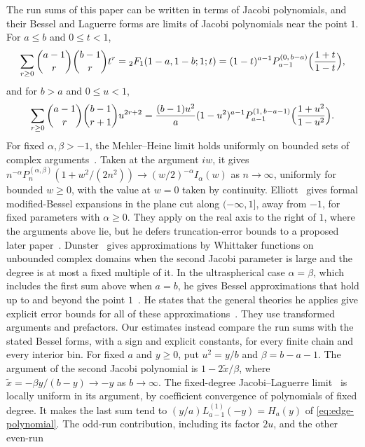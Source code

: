 \begin{remark}\label{rem:jacobi}
The run sums of this paper can be written in terms of Jacobi polynomials, and
their Bessel and Laguerre forms are limits of Jacobi polynomials near the
point $1$.
For $a\le b$ and $0\le t<1$,
\[
 \sum_{r\ge0}\binom{a-1}{r}\binom{b-1}{r}t^r
 ={}_2F_1(1-a,1-b;1;t)
 =(1-t)^{a-1}P_{a-1}^{(0,\,b-a)}\Bigl(\frac{1+t}{1-t}\Bigr),
\]
and for $b>a$ and $0\le u<1$,
\[
 \sum_{r\ge0}\binom{a-1}{r}\binom{b-1}{r+1}u^{2r+2}
 =\frac{(b-1)u^2}{a}(1-u^2)^{a-1}P_{a-1}^{(1,\,b-a-1)}\Bigl(\frac{1+u^2}{1-u^2}\Bigr).
\]
For fixed $\alpha,\beta>-1$, the Mehler--Heine limit
\cite[Eq.~18.11.5]{dlmf} holds uniformly on bounded sets of complex
arguments~\cite[Theorem~8.1.1]{szego1975}. Taken at the argument $iw$, it gives
$n^{-\alpha}P_n^{(\alpha,\beta)}(1+w^2/(2n^2))
\to(w/2)^{-\alpha}I_\alpha(w)$ as $n\to\infty$, uniformly for bounded $w\ge0$,
with the value at $w=0$ taken by continuity.
Elliott~\cite[Section~3, Eq.~(3.10)]{elliott1971} gives formal modified-Bessel
expansions in the plane cut along $(-\infty,1]$, away from $-1$, for fixed
parameters with $\alpha\ge0$. They apply on the real axis to the right of $1$,
where the arguments above lie, but he defers truncation-error bounds to a
proposed later paper~\cite[Section~1]{elliott1971}.
Dunster~\cite[Section~2, Eqs.~(2.43) to~(2.50)]{dunster1999} gives
approximations by Whittaker functions on unbounded complex domains when the
second Jacobi parameter is large and the degree is at most a fixed multiple
of it. In the ultraspherical case $\alpha=\beta$, which includes the
first sum above when $a=b$, he gives Bessel approximations that hold up
to and beyond the point $1$~\cite[Section~5, Eqs.~(5.11), (5.15)
and~(5.16)]{dunster1999}. He states that the general theories he applies
give explicit error bounds for all of these approximations~\cite[p.~287]{dunster1999}. They use transformed arguments
and prefactors. Our estimates instead compare the run sums with the stated
Bessel forms, with a sign and explicit constants, for every finite chain
and every interior bin.
For fixed $a$ and $y\ge0$, put $u^2=y/b$ and $\beta=b-a-1$. The argument of
the second Jacobi polynomial is $1-2\tilde x/\beta$, where
$\tilde x=-\beta y/(b-y)\to-y$ as $b\to\infty$.
The fixed-degree Jacobi--Laguerre limit~\cite[Eq.~18.7.21]{dlmf} is locally
uniform in its argument, by coefficient convergence of polynomials of fixed
degree. It makes the last sum tend to
$(y/a)L_{a-1}^{(1)}(-y)=H_a(y)$ of \eqref{eq:edge-polynomial}.
The odd-run contribution, including its factor $2u$, and the other even-run

\end{remark}
